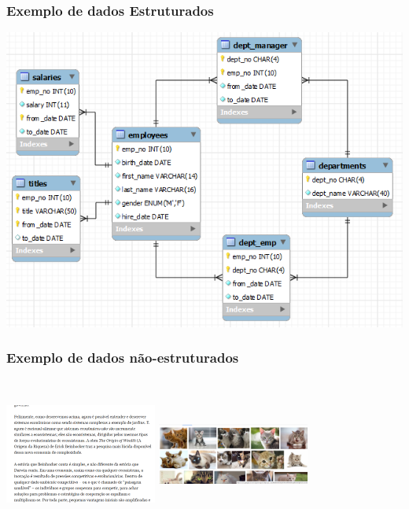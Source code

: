 \documentclass[11pt]{beamer}
\begin{document}
\begin{frame}
\frametitle{Exemplo de dados Estruturados}
\begin{center} \includegraphics[width=\linewidth,height=\textheight,keepaspectratio]{DadosEstruturados.png}
\end{center}
\end{frame}

\begin{frame}
\frametitle{Exemplo de dados não-estruturados}
\includegraphics[width=5cm,height=5cm,keepaspectratio]{texto_data.png}
\includegraphics[width=5cm,height=5cm,keepaspectratio]{ibagens_data.png}
\end{frame}
\end{document}
